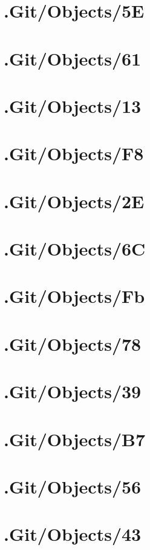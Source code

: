 \section*{.Git/Objects/5E}

\section*{.Git/Objects/61}

\section*{.Git/Objects/13}

\section*{.Git/Objects/F8}

\section*{.Git/Objects/2E}

\section*{.Git/Objects/6C}

\section*{.Git/Objects/Fb}

\section*{.Git/Objects/78}

\section*{.Git/Objects/39}

\section*{.Git/Objects/B7}

\section*{.Git/Objects/56}

\section*{.Git/Objects/43}

